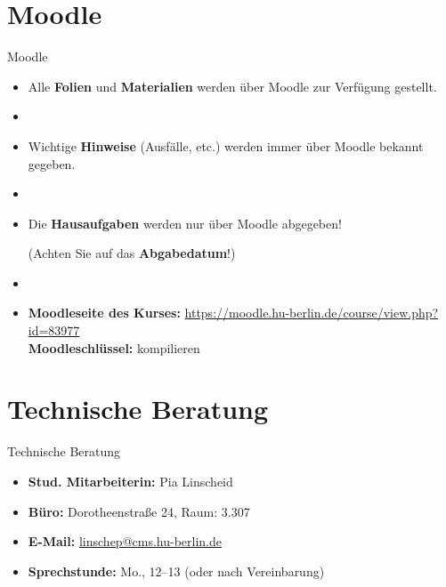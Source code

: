 \section{Moodle}	

\begin{frame}{Moodle}

\begin{itemize}
	\item Alle \textbf{Folien} und \textbf{Materialien} werden über Moodle zur Verfügung gestellt.
	\item[]
	\item Wichtige \textbf{Hinweise} (Ausfälle, etc.) werden immer über Moodle bekannt gegeben.
	\item[]
	\item Die \textbf{Hausaufgaben} werden nur über Moodle abgegeben! 
	
	(Achten Sie auf das \textbf{Abgabedatum}!)
	\item[]
	\item \textbf{Moodleseite des Kurses:} \href{https://moodle.hu-berlin.de/course/view.php?id=83977}{https://moodle.hu-berlin.de/course/view.php?id=83977}\\
	\textbf{Moodleschlüssel:} kompilieren
\end{itemize}		

\end{frame}


\section{Technische Beratung}

\begin{frame}{Technische Beratung}

\begin{itemize}
	\item \textbf{Stud. Mitarbeiterin:} Pia Linscheid
	
	\item \textbf{Büro:} Dorotheenstraße 24, Raum: 3.307

	\item \textbf{E-Mail:} \href{mailto:linschep@cms.hu-berlin.de}{linschep@cms.hu-berlin.de}
	
	\item \textbf{Sprechstunde:} Mo., 12--13 (oder nach Vereinbarung)
\end{itemize}	

\end{frame}





